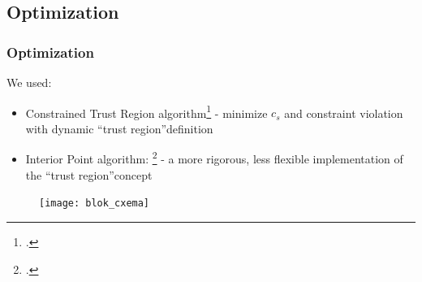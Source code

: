 \subsection{Optimization}
\begin{frame}
  \frametitle{Optimization}
  We used:
  \begin{itemize}
    \item Constrained Trust Region algorithm\footcite{scipyctr} - minimize $c_s$ and constraint violation with dynamic \textquotedblleft trust region\textquotedblright definition
    \item Interior Point algorithm: \footcite{byrd2000trust} - a more rigorous, less flexible implementation of the \textquotedblleft trust region\textquotedblright concept
  \end{itemize}
  \vspace{0.5cm}
  \begin{figure}
    \texttt{[image: blok\_cxema]}
  \end{figure}
\end{frame}
